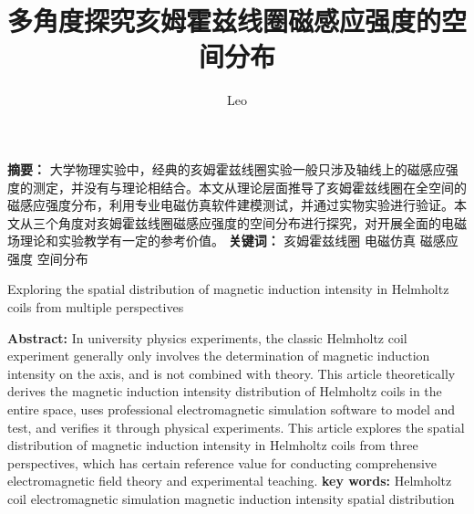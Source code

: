 \documentclass{ctexart}
\author{Leo}
\title{多角度探究亥姆霍兹线圈磁感应强度的空间分布}
\date{}
\begin{document}
\newcommand{\noindentbf}[1]{\noindent \textbf{#1} \quad}
\maketitle
\noindentbf{摘要：}
大学物理实验中，经典的亥姆霍兹线圈实验一般只涉及轴线上的磁感应强度的测定，并没有与理论相结合。本文从理论层面推导了亥姆霍兹线圈在全空间的磁感应强度分布，利用专业电磁仿真软件建模测试，并通过实物实验进行验证。本文从三个角度对亥姆霍兹线圈磁感应强度的空间分布进行探究，对开展全面的电磁场理论和实验教学有一定的参考价值。
\newline
\noindentbf{关键词：}亥姆霍兹线圈 \quad 电磁仿真 \quad 磁感应强度 \quad  空间分布
\begin{center}
    {\LARGE Exploring the spatial distribution of magnetic induction intensity in Helmholtz coils from multiple perspectives}
\end{center}
\noindentbf{Abstract:}
In university physics experiments, the classic Helmholtz coil experiment generally only involves the determination of magnetic induction intensity on the axis, and is not combined with theory. This article theoretically derives the magnetic induction intensity distribution of Helmholtz coils in the entire space, uses professional electromagnetic simulation software to model and test, and verifies it through physical experiments. This article explores the spatial distribution of magnetic induction intensity in Helmholtz coils from three perspectives, which has certain reference value for conducting comprehensive electromagnetic field theory and experimental teaching.
\noindentbf{key words:}Helmholtz coil \quad electromagnetic simulation \quad magnetic induction intensity \quad spatial distribution
\end{document}

